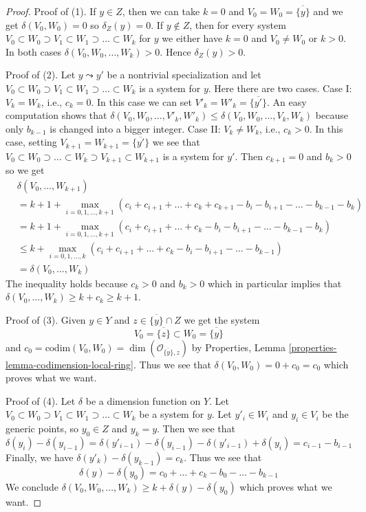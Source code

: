 \documentclass[10pt,a4paper]{amsart}
\theoremstyle{plain}
\theoremstyle{definition}
\theoremstyle{remark}
\numberwithin{equation}{subsection}
\begin{document}
\begin{proof}
Proof of (1). If $y \in Z$, then we can take $k = 0$ and
$V_0 = W_0 = \overline{\{y\}}$ and we get $\delta(V_0, W_0) = 0$ so
$\delta_Z(y) = 0$. If $y \not \in Z$, then for every system
$V_0 \subset W_0 \supset V_1 \subset W_1 \supset \ldots \subset W_k$
for $y$ we either have $k = 0$ and $V_0 \not = W_0$ or $k > 0$.
In both cases $\delta(V_0, W_0, \ldots, W_k) > 0$. Hence $\delta_Z(y) > 0$.

\medskip\noindent
Proof of (2). Let $y \leadsto y'$ be a nontrivial specialization and let
$V_0 \subset W_0 \supset V_1 \subset W_1 \supset \ldots \subset W_k$
is a system for $y$. Here there are two cases.
Case I: $V_k = W_k$, i.e., $c_k = 0$. In this case
we can set $V'_k = W'_k = \overline{\{y'\}}$.
An easy computation shows that
$\delta(V_0, W_0, \ldots, V'_k, W'_k) \leq
\delta(V_0, W_0, \ldots, V_k, W_k)$
because only $b_{k - 1}$ is changed into a bigger integer.
Case II: $V_k \not = W_k$, i.e., $c_k > 0$.
In this case, setting $V_{k + 1} = W_{k + 1} = \overline{\{y'\}}$
we see that $V_0 \subset W_0 \supset \ldots \subset W_k \supset V_{k + 1}
\subset W_{k + 1}$ is a system for $y'$. Then $c_{k + 1} = 0$ and
$b_k > 0$ so we get
\begin{align*}
& \delta(V_0, \ldots, W_{k + 1}) \\
& =
k + 1 +
\max_{i = 0, 1, \ldots, k + 1}
(c_i + c_{i + 1} + \ldots + c_k + c_{k + 1}
- b_i - b_{i + 1} - \ldots - b_{k - 1} - b_k) \\
& =
k + 1 +
\max_{i = 0, 1, \ldots, k + 1}
(c_i + c_{i + 1} + \ldots + c_k
- b_i - b_{i + 1} - \ldots - b_{k - 1} - b_k) \\
& \leq
k + \max_{i = 0, 1, \ldots, k}
(c_i + c_{i + 1} + \ldots + c_k - b_i - b_{i + 1} - \ldots - b_{k - 1}) \\
& = \delta(V_0, \ldots, W_k)
\end{align*}
The inequality holds because $c_k > 0$ and $b_k > 0$ which in particular
implies that $\delta(V_0, \ldots, W_k) \geq k + c_k \geq k + 1$.

\medskip\noindent
Proof of (3). Given $y \in Y$ and $z \in \overline{\{y\}} \cap Z$
we get the system
$$
V_0 = \overline{\{z\}} \subset W_0 = \overline{\{y\}}
$$
and $c_0 = \text{codim}(V_0, W_0) = \dim(\mathcal{O}_{\overline{\{y\}}, z})$
by Properties, Lemma \ref{properties-lemma-codimension-local-ring}.
Thus we see that $\delta(V_0, W_0) = 0 + c_0 = c_0$ which proves
what we want.

\medskip\noindent
Proof of (4). Let $\delta$ be a dimension function on $Y$.
Let $V_0 \subset W_0 \supset V_1 \subset W_1 \supset \ldots \subset W_k$
be a system for $y$. Let $y'_i \in W_i$ and $y_i \in V_i$ be the
generic points, so $y_0 \in Z$ and $y_k = y$. Then we see that
$$
\delta(y_i) - \delta(y_{i - 1}) =
\delta(y'_{i - 1}) - \delta(y_{i - 1}) - \delta(y'_{i - 1}) + \delta(y_i) =
c_{i - 1} - b_{i - 1}
$$
Finally, we have $\delta(y'_k) - \delta(y_{k - 1}) = c_k$.
Thus we see that
$$
\delta(y) - \delta(y_0) =
c_0 + \ldots + c_k - b_0 - \ldots - b_{k - 1}
$$
We conclude
$\delta(V_0, W_0, \ldots, W_k) \geq k + \delta(y) - \delta(y_0)$
which proves what we want.


\end{proof}
\end{document}
